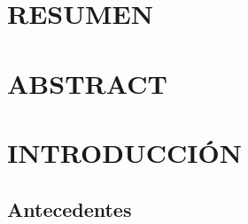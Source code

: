\documentclass[
]{article}
\begin{document}
\cleardoublepage

\tableofcontents
\listoftables
\listoffigures

\cleardoublepage
{}

\newpage

\section*{RESUMEN}

\cleardoublepage

\section*{ABSTRACT}

\cleardoublepage

\section{INTRODUCCIÓN}

\subsection{Antecedentes}
\end{document}
